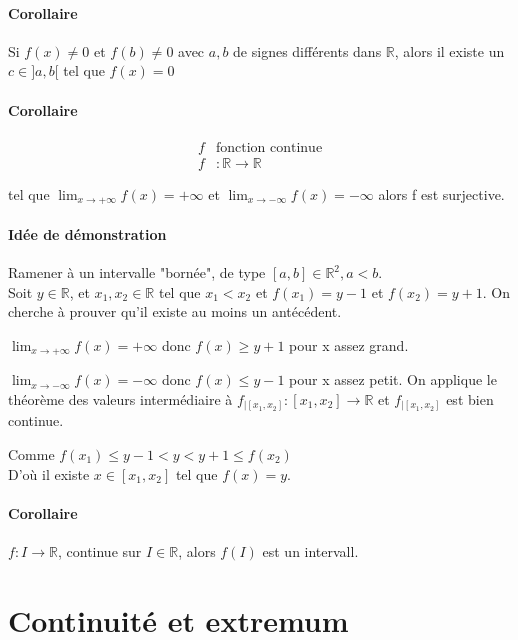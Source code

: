 \paragraph{Corollaire}
Si $f(x) \neq 0$ et $f(b) \neq 0$ avec $a, b$ de signes différents dans $\mathbb{R}$, alors il existe un $c \in ]a, b[$ tel que $f(x) = 0$

\paragraph{Corollaire}

\begin{align*} 
	f & \text{fonction continue} \\
	f & : \mathbb{R} \rightarrow \mathbb{R}
\end{align*}

tel que $\lim_{x\to +\infty} f(x) = +\infty$ et $\lim_{x\to -\infty} f(x) = -\infty$ alors f est surjective.

\paragraph{Idée de démonstration}

Ramener à un intervalle "bornée", de type $[a, b] \in \mathbb{R}^2, a < b$. ~\\
Soit $y \in \mathbb{R}$, et $x_1, x_2 \in \mathbb{R}$ tel que $x_1 < x_2$ et $f(x_1) = y-1$ et $f(x_2) = y+1$. On cherche à prouver qu'il existe au moins un antécédent.

$\lim_{x\to +\infty} f(x) = +\infty$ donc $f(x) \geq y + 1$ pour x assez grand.

$\lim_{x\to -\infty} f(x) = -\infty$ donc $f(x) \leq y - 1$ pour x assez petit.
On applique le théorème des valeurs intermédiaire à $f_{|[x_1, x_2]} : [x_1, x_2] \rightarrow \mathbb{R}$ et $f_{|[x_1, x_2]}$ est bien continue. 

Comme $f(x_1) \leq y-1 < y < y+1 \leq f(x_2)$
~\\
D'où il existe $x \in [x_1, x_2]$ tel que $f(x) = y$.
\paragraph{Corollaire} 
$f : I \rightarrow \mathbb{R}$, continue sur $I \in \mathbb{R}$, alors $f(I)$ est un intervall.

\section{Continuité et extremum}

